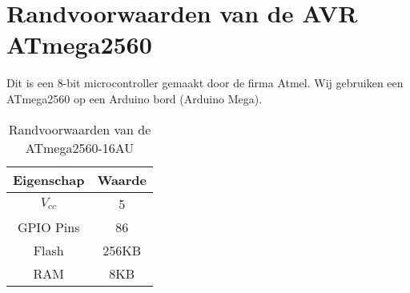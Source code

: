 \documentclass{scrreprt} %
\begin{document}
\section {Randvoorwaarden van de AVR ATmega2560}
Dit is een 8-bit microcontroller gemaakt door de firma Atmel. Wij gebruiken een ATmega2560 op een Arduino bord (Arduino Mega).
\begin{table}[H]
\centering
\caption{Randvoorwaarden van de ATmega2560-16AU}
\label{tab:spec-avr}
\begin{tabular}{c c}
	\hline\hline
 	Eigenschap & Waarde\\
 	\hline
	$V_{cc}$ & 5\volt \\
	GPIO Pins & 86 \\
	Flash & 256KB \\
	RAM & 8KB \\
  	\hline
\end{tabular}
\end{table}
\end{document}
